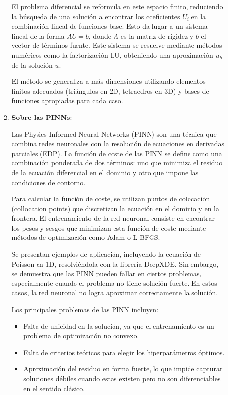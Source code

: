 \documentclass{article}
\begin{document}
\begin{enumerate}
\begin{itemize}
\begin{enumerate}
        El problema diferencial se reformula en este espacio finito, reduciendo la búsqueda de una solución a encontrar los coeficientes \(U_i\) en la combinación lineal de funciones base. Esto da lugar a un sistema lineal de la forma \(AU = b\), donde \(A\) es la matriz de rigidez y \(b\) el vector de términos fuente. Este sistema se resuelve mediante métodos numéricos como la factorización LU, obteniendo una aproximación \(u_h\) de la solución \(u\).

        El método se generaliza a más dimensiones utilizando elementos finitos adecuados (triángulos en 2D, tetraedros en 3D) y bases de funciones apropiadas para cada caso.
        
        \item \textbf{Sobre las PINNs}:
        
        Las Physics-Informed Neural Networks (PINN) son una técnica que combina redes neuronales con la resolución de ecuaciones en derivadas parciales (EDP). La función de coste de las PINN se define como una combinación ponderada de dos términos: uno que minimiza el residuo de la ecuación diferencial en el dominio y otro que impone las condiciones de contorno.

        Para calcular la función de coste, se utilizan puntos de colocación (collocation points) que discretizan la ecuación en el dominio y en la frontera. El entrenamiento de la red neuronal consiste en encontrar los pesos y sesgos que minimizan esta función de coste mediante métodos de optimización como Adam o L-BFGS.

        Se presentan ejemplos de aplicación, incluyendo la ecuación de Poisson en 1D, resolviéndola con la librería DeepXDE. Sin embargo, se demuestra que las PINN pueden fallar en ciertos problemas, especialmente cuando el problema no tiene solución fuerte. En estos casos, la red neuronal no logra aproximar correctamente la solución.

        Los principales problemas de las PINN incluyen:
        \begin{itemize}
            \item Falta de unicidad en la solución, ya que el entrenamiento es un problema de optimización no convexo.
            \item Falta de criterios teóricos para elegir los hiperparámetros óptimos.
            \item Aproximación del residuo en forma fuerte, lo que impide capturar soluciones débiles cuando estas existen pero no son diferenciables en el sentido clásico.
        \end{itemize}


\end{enumerate}
\end{itemize}
\end{enumerate}
\end{document}
